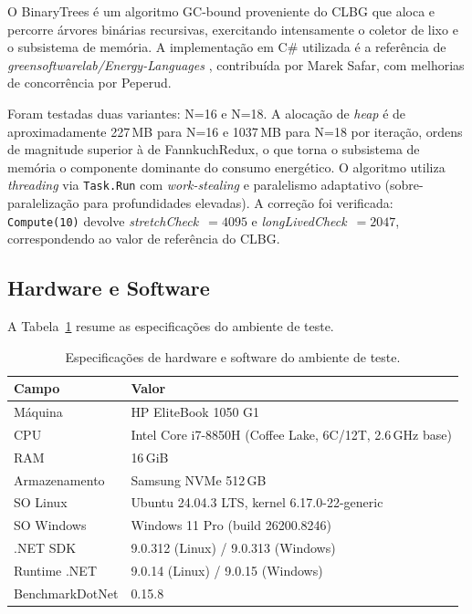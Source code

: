 \documentclass[12pt,a4paper]{article}
\begin{document}
O BinaryTrees é um algoritmo GC-bound proveniente do CLBG \cite{CLBG} que
aloca e percorre árvores binárias recursivas, exercitando intensamente o
coletor de lixo e o subsistema de memória.
A implementação em C\# utilizada é a referência de
\textit{greensoftwarelab/Energy-Languages} \cite{EnergyLanguages}, contribuída
por Marek Safar, com melhorias de concorrência por Peperud.

Foram testadas duas variantes: N=16 e N=18.
A alocação de \textit{heap} é de aproximadamente 227\,MB para N=16 e 1037\,MB
para N=18 por iteração, ordens de magnitude superior à de FannkuchRedux,
o que torna o subsistema de memória o componente dominante do consumo
energético.
O algoritmo utiliza \textit{threading} via \texttt{Task.Run} com
\textit{work-stealing} e paralelismo adaptativo (sobre-paralelização para
profundidades elevadas).
A correção foi verificada: \texttt{Compute(10)} devolve
\textit{stretchCheck}~$=4095$ e \textit{longLivedCheck}~$=2047$,
correspondendo ao valor de referência do CLBG.

\subsection{Hardware e Software}

A Tabela~\ref{tab:hardware} resume as especificações do ambiente de teste.

\begin{table}[H]
  \centering
  \caption{Especificações de hardware e software do ambiente de teste.}
  \label{tab:hardware}
  \begin{tabular}{ll}
    \toprule
    \textbf{Campo} & \textbf{Valor} \\
    \midrule
    Máquina        & HP EliteBook 1050 G1 \\
    CPU            & Intel Core i7-8850H (Coffee Lake, 6C/12T, 2.6\,GHz base) \\
    RAM            & 16\,GiB \\
    Armazenamento  & Samsung NVMe 512\,GB \\
    SO Linux       & Ubuntu 24.04.3 LTS, kernel 6.17.0-22-generic \\
    SO Windows     & Windows 11 Pro (build 26200.8246) \\
    .NET SDK       & 9.0.312 (Linux) / 9.0.313 (Windows) \\
    Runtime .NET   & 9.0.14 (Linux) / 9.0.15 (Windows) \\
    BenchmarkDotNet & 0.15.8 \\
    \bottomrule
  \end{tabular}
\end{table}
\end{document}
